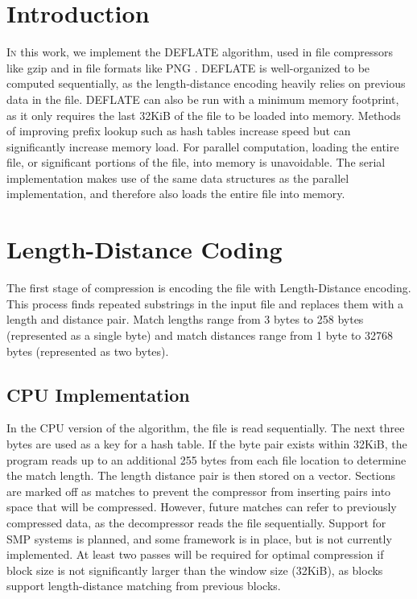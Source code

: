 \documentclass[twoside]{article}
\begin{document}
\begin{multicols}{2} %

\section{Introduction}

\lettrine[nindent=0em,lines=3]{I} n this work, we implement the DEFLATE algorithm, used in file compressors like gzip and in file formats like PNG \cite{RFC1950}. DEFLATE is well-organized to be computed sequentially, as the length-distance encoding heavily relies on previous data in the file. DEFLATE can also be run with a minimum memory footprint, as it only requires the last 32KiB of the file to be loaded into memory. Methods of improving prefix lookup such as hash tables increase speed but can significantly increase memory load. For parallel computation, loading the entire file, or significant portions of the file, into memory is unavoidable. The serial implementation makes use of the same data structures as the parallel implementation, and therefore also loads the entire file into memory.


\section{Length-Distance Coding}

The first stage of compression is encoding the file with Length-Distance encoding. This process finds repeated substrings in the input file and replaces them with a length and distance pair. Match lengths range from 3 bytes to 258 bytes (represented as a single byte) and match distances range from 1 byte to 32768 bytes (represented as two bytes).

\subsection{CPU Implementation}

In the CPU version of the algorithm, the file is read sequentially. The next three bytes are used as a key for a hash table. If the byte pair exists within 32KiB, the program reads up to an additional 255 bytes from each file location to determine the match length. The length distance pair is then stored on a vector. Sections are marked off as matches to prevent the compressor from inserting pairs into space that will be compressed. However, future matches can refer to previously compressed data, as the decompressor reads the file sequentially. Support for SMP systems is planned, and some framework is in place, but is not currently implemented. At least two passes will be required for optimal compression if block size is not significantly larger than the window size (32KiB), as blocks support length-distance matching from previous blocks.


\end{multicols}
\end{document}
